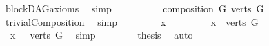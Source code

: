 \begin{isabellebody}
\ blockDAG{\isacharunderscore}{\kern0pt}axioms\ \isamarkupfalse%
\ simp\isanewline
\ \ \isamarkupfalse%
\ \isanewline
\ \ \ \ \isamarkupfalse%
\ {\isachardoublequoteopen}composition\ G\ {\isacharparenleft}{\kern0pt}verts\ G{\isacharparenright}{\kern0pt}{\isachardoublequoteclose}\ \isamarkupfalse%
\ trivialComposition\ \isamarkupfalse%
\ simp\isanewline
\ \ \isamarkupfalse%
\isanewline
\ \ \ \ \isamarkupfalse%
\ x\ \ \ \isanewline
\ \ \ \ \isamarkupfalse%
\ {\isachardoublequoteopen}x\ {\isasymin}\ verts\ G{\isachardoublequoteclose}\isanewline
\ \ \ \ \isamarkupfalse%
\ \isamarkupfalse%
\ {\isachardoublequoteopen}\ x\ {\isasymin}\ {\isasymUnion}\ {\isacharbraceleft}{\kern0pt}verts\ G{\isacharbraceright}{\kern0pt}{\isachardoublequoteclose}\ \isamarkupfalse%
\ simp\isanewline
\ \ \isamarkupfalse%
\isanewline
\ \ \isamarkupfalse%
\ \isamarkupfalse%
\ {\isachardoublequoteopen}{\isacharquery}{\kern0pt}thesis{\isachardoublequoteclose}\ \isamarkupfalse%
\ auto\isanewline
{}\isamarkupfalse%
%
\endisatagproof
{\isafoldproof}%
%
\isadelimproof
\isanewline
%
\endisadelimproof
%
\isadelimtheory
%
\endisadelimtheory
%
\isatagtheory
{}\isamarkupfalse%
%
\endisatagtheory
{\isafoldtheory}%
%
\isadelimtheory
%
\endisadelimtheory
%
\end{isabellebody}%
\endinput

